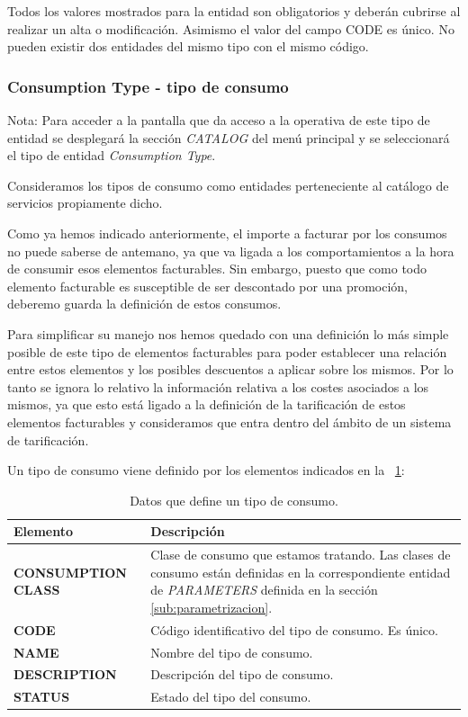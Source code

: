 Todos los valores mostrados para la entidad son obligatorios y deberán cubrirse al realizar un alta o modificación. Asimismo el valor del campo CODE es único. No pueden existir dos entidades del mismo tipo con el mismo código.




\subsubsection{Consumption Type - tipo de consumo}
\label{sub:consumption-type}

Nota: Para acceder a la pantalla que da acceso a la operativa de este tipo de entidad se desplegará la sección \emph{CATALOG} del menú principal y se seleccionará el tipo de entidad \emph{Consumption Type}.

Consideramos los tipos de consumo como entidades perteneciente al catálogo de servicios propiamente dicho.

Como ya hemos indicado anteriormente, el importe a facturar por los consumos no puede saberse de antemano, ya que va ligada a los comportamientos a la hora de consumir esos elementos facturables. Sin embargo, puesto que como todo elemento facturable es susceptible de ser descontado por una promoción, deberemo guarda la definición de estos consumos.

Para simplificar su manejo nos hemos quedado con una definición lo más simple posible de este tipo de elementos facturables para poder establecer una relación entre estos elementos y los posibles descuentos a aplicar sobre los mismos. Por lo tanto se ignora lo relativo la información relativa a los costes asociados a los mismos, ya que esto está ligado a la definición de la tarificación de estos elementos facturables y consideramos que entra dentro del ámbito de un sistema de tarificación. 

Un tipo de consumo viene definido por los elementos indicados en la \tablename~\ref{tab:tipo-consumo}:



\begin{table}[H]
  \centering
  \setlength{\leftmargini}{0.4cm}
  \resizebox{14cm}{!} {
  \begin{tabular}{|m{3cm} m{11cm}|}
  \rowcolor{udcpink!25}
  \hline
  	\textbf{Elemento} & \textbf{Descripción} \\\hline
  	\textbf{CONSUMPTION CLASS} & Clase de consumo que estamos tratando. Las clases de consumo están definidas en la correspondiente entidad de \emph{PARAMETERS} definida en la sección \ref{sub:parametrizacion}.   \\
	\textbf{CODE} & Código identificativo del tipo de consumo. Es único.   \\
	\textbf{NAME} & Nombre del tipo de consumo. \\
	\textbf{DESCRIPTION} & Descripción del tipo de consumo. \\		
	\textbf{STATUS} & Estado del tipo del consumo.
	\\\hline
  \end{tabular}
  } %
  \caption{Datos que define un tipo de consumo.}
  \label{tab:tipo-consumo}
\end{table}

